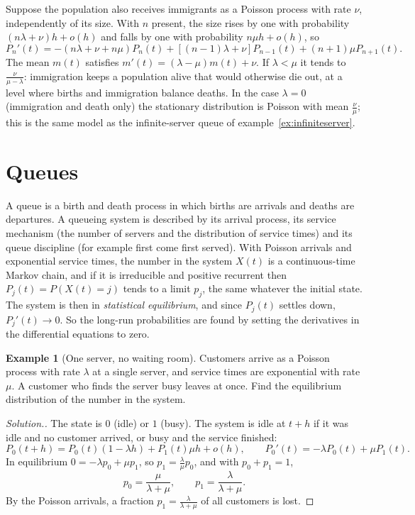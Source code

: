 \documentclass[12pt,a4paper]{report}
\theoremstyle{definition}
\newtheorem{exa}[thm]{Example}
\newenvironment{solution}
  {\renewcommand{\qedsymbol}{}\begin{proof}[\textit{Solution}.]}
  {\end{proof}}
\begin{document}
Suppose the population also receives immigrants as a Poisson process with rate $\nu$,
independently of its size. With $n$ present, the size rises by one with probability
$(n\lambda + \nu)h + o(h)$ and falls by one with probability $n\mu h + o(h)$, so
\[P_n'(t) = -(n\lambda + \nu + n\mu)P_n(t) + \left[(n - 1)\lambda + \nu\right]P_{n-1}(t) + (n + 1)\mu P_{n+1}(t) .\]
The mean $m(t)$ satisfies $m'(t) = (\lambda - \mu)m(t) + \nu$. If $\lambda<\mu$ it tends to
$\frac{\nu}{\mu - \lambda}$: immigration keeps a population alive that would otherwise die out, at a level
where births and immigration balance deaths. In the case $\lambda = 0$ (immigration and death
only) the stationary distribution is Poisson with mean $\frac\nu\mu$; this is the same model as the
infinite-server queue of example~\ref{ex:infiniteserver}.

\section{Queues}

A queue is a birth and death process in which births are arrivals and deaths are departures. A
queueing system is described by its arrival process, its service mechanism (the number of
servers and the distribution of service times) and its queue discipline (for example first come
first served). With Poisson arrivals and exponential service times, the number in the system
$X(t)$ is a continuous-time Markov chain, and if it is irreducible and positive recurrent then
$P_j(t) = P(X(t) = j)$ tends to a limit $p_j$, the same whatever the initial state. The system is then
in \emph{statistical equilibrium}, and since $P_j(t)$ settles down, $P_j'(t)\to 0$. So the long-run
probabilities are found by setting the derivatives in the differential equations to zero.

\begin{exa}[One server, no waiting room]
\label{ex:lossqueue}
Customers arrive as a Poisson process with rate $\lambda$ at a single server, and service times are
exponential with rate $\mu$. A customer who finds the server busy leaves at once. Find the
equilibrium distribution of the number in the system.
\end{exa}

\begin{solution}
The state is $0$ (idle) or $1$ (busy). The system is idle at $t + h$ if it was idle and no customer
arrived, or busy and the service finished:
\[P_0(t + h) = P_0(t)(1 - \lambda h) + P_1(t)\mu h + o(h),\qquad P_0'(t) = -\lambda P_0(t) + \mu P_1(t) .\]
In equilibrium $0 = -\lambda p_0 + \mu p_1$, so $p_1 = \frac\lambda\mu p_0$, and with $p_0 + p_1 = 1$,
\[p_0 = \frac{\mu}{\lambda + \mu},\qquad p_1 = \frac{\lambda}{\lambda + \mu} .\]
By the Poisson arrivals, a fraction $p_1 = \frac{\lambda}{\lambda + \mu}$ of all customers is lost.
\end{solution}
\end{document}
